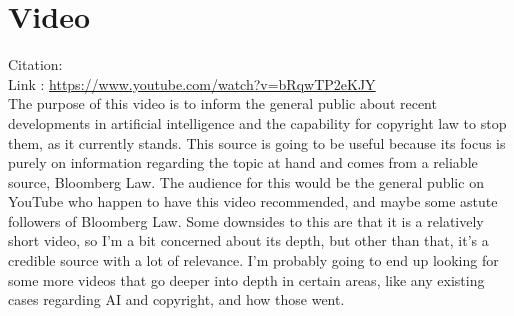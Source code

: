 \documentclass{article}
\begin{document}
\section{Video}

Citation: \cite{bloomberglaw2023}
\\
Link : \url{https://www.youtube.com/watch?v=bRqwTP2eKJY}
\\

The purpose of this video is to inform the general public about recent
developments in artificial intelligence and the capability for copyright
law to stop them, as it currently stands. This source is going to be useful
because its focus is purely on information regarding the topic at hand and
comes from a reliable source, Bloomberg Law. The audience for this would
be the general public on YouTube who happen to have this video recommended,
and maybe some astute followers of Bloomberg Law. Some downsides to this are
that it is a relatively short video, so I'm a bit concerned about its depth,
but other than that, it's a credible source with a lot of relevance. I'm
probably going to end up looking for some more videos that
go deeper into depth in certain areas, like any existing cases regarding AI and copyright,
and how those went.


\medskip

\printbibliography
\end{document}

